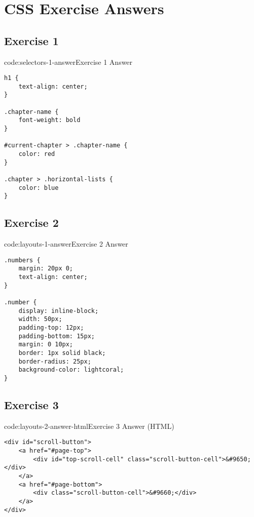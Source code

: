 \section{CSS Exercise Answers}\label{sect:css-exercise-answers}

\subsection*{Exercise 1}

\begin{codeenv}{code:selectors-1-answer}{Exercise 1 Answer}\begin{verbatim}
h1 {
    text-align: center;
}

.chapter-name {
    font-weight: bold
}

#current-chapter > .chapter-name {
    color: red
}

.chapter > .horizontal-lists {
    color: blue
}
\end{verbatim}
\end{codeenv}

\subsection*{Exercise 2}

\begin{codeenv}{code:layouts-1-answer}{Exercise 2 Answer}\begin{verbatim}
.numbers {
    margin: 20px 0;
    text-align: center;
}

.number {
    display: inline-block;
    width: 50px;
    padding-top: 12px;
    padding-bottom: 15px;
    margin: 0 10px;
    border: 1px solid black;
    border-radius: 25px;
    background-color: lightcoral;
}
\end{verbatim}
\end{codeenv}

\subsection*{Exercise 3}

\begin{codeenv}{code:layouts-2-answer-html}{Exercise 3 Answer (HTML)}\begin{verbatim}
<div id="scroll-button">
    <a href="#page-top">
        <div id="top-scroll-cell" class="scroll-button-cell">&#9650;</div>
    </a>
    <a href="#page-bottom">
        <div class="scroll-button-cell">&#9660;</div>
    </a>
</div>
\end{verbatim}
\end{codeenv}

